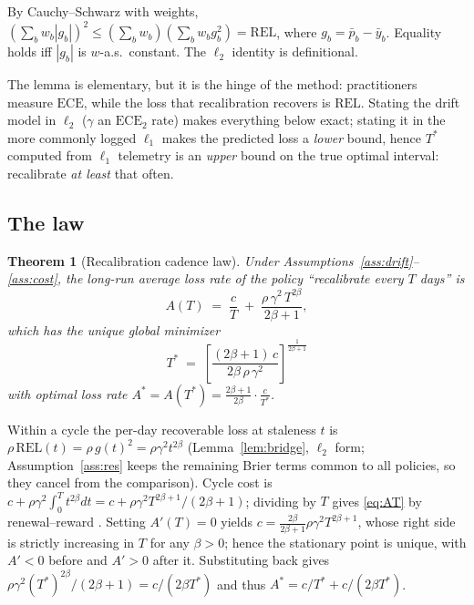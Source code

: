 \documentclass[conference]{IEEEtran}
\newtheorem{theorem}{Theorem}
\begin{document}
\begin{IEEEproof}
By Cauchy--Schwarz with weights,
$(\sum_b w_b|g_b|)^2\le(\sum_b w_b)(\sum_b w_b g_b^2)=\mathrm{REL}$,
where $g_b=\bar p_b-\bar y_b$. Equality holds iff $|g_b|$ is $w$-a.s.\
constant. The $\ell_2$ identity is definitional.
\end{IEEEproof}

The lemma is elementary, but it is the hinge of the method: practitioners
measure $\mathrm{ECE}$, while the loss that recalibration recovers is
$\mathrm{REL}$. Stating the drift model in $\ell_2$ ($\gamma$ an
$\mathrm{ECE}_2$ rate) makes everything below exact; stating it in the more
commonly logged $\ell_1$ makes the predicted loss a \emph{lower} bound, hence
$T^{*}$ computed from $\ell_1$ telemetry is an \emph{upper} bound on the true
optimal interval: recalibrate \emph{at least} that often.

\subsection{The law}

\begin{theorem}[Recalibration cadence law]
\label{thm:law}
Under Assumptions~\ref{ass:drift}--\ref{ass:cost}, the long-run average loss
rate of the policy ``recalibrate every $T$ days'' is
\begin{equation}
A(T)\;=\;\frac{c}{T}\;+\;\frac{\rho\,\gamma^{2}\,T^{2\beta}}{2\beta+1},
\label{eq:AT}
\end{equation}
which has the unique global minimizer
\begin{equation}
\boxed{\;
T^{*}\;=\;\left[\frac{(2\beta+1)\,c}{2\beta\,\rho\,\gamma^{2}}\right]^{\frac{1}{2\beta+1}}
\;}
\label{eq:law}
\end{equation}
with optimal loss rate
$A^{*}=A(T^{*})=\frac{2\beta+1}{2\beta}\cdot\frac{c}{T^{*}}$.
\end{theorem}

\begin{IEEEproof}
Within a cycle the per-day recoverable loss at staleness $t$ is
$\rho\,\mathrm{REL}(t)=\rho\,g(t)^2=\rho\gamma^2t^{2\beta}$
(Lemma~\ref{lem:bridge}, $\ell_2$ form; Assumption~\ref{ass:res} keeps the
remaining Brier terms common to all policies, so they cancel from the
comparison). Cycle cost is $c+\rho\gamma^{2}\int_0^T t^{2\beta}dt
= c+\rho\gamma^{2}T^{2\beta+1}/(2\beta+1)$; dividing by $T$ gives
\eqref{eq:AT} by renewal--reward \cite{ross1996}. Setting $A'(T)=0$ yields
$c=\frac{2\beta}{2\beta+1}\rho\gamma^{2}T^{2\beta+1}$, whose right side is
strictly increasing in $T$ for any $\beta>0$; hence the stationary point is
unique, with $A'<0$ before and $A'>0$ after it. Substituting back gives
$\rho\gamma^2 (T^{*})^{2\beta}/(2\beta+1) = c/(2\beta T^{*})$ and thus
$A^{*}=c/T^{*}+c/(2\beta T^{*})$.
\end{IEEEproof}
\end{document}
